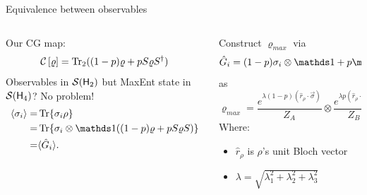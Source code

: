\begin{frame}{Equivalence between observables}
    \begin{columns}
        \begin{column}{0.5\textwidth}
            Our CG map:
            \begin{equation*}
                \mathcal{C}\left[\varrho\right]=\Tr_{2}((1-p)\varrho+pS\varrho S^{\dag})
            \end{equation*}
            Observables in $\mathcal{S}({\sf H}_{2})$ but MaxEnt state in $\mathcal{S}({\sf H}_{4})$? No problem!
            \begin{align*}
                \langle \sigma_{i}\rangle=&\Tr{\sigma_{i} \rho}\\
                =&\Tr{\sigma_{i}\otimes\Id((1-p)\varrho+pS\varrho S)}\\
                =&\langle \hat{G}_{i}\rangle.
            \end{align*}
        \end{column}
        \begin{column}{0.5\textwidth}
            Construct $\varrho_{max}$ via
            \begin{equation*}
                \hat{G}_{i}=(1-p)\sigma_{i}\otimes\Id+p\Id\otimes\sigma_{i}.
            \end{equation*}
            as
            \begin{equation*}
                \varrho_{max}=\frac{e^{\lambda (1-p)(\hat{r}_{\rho}\cdot\vec{\sigma})}}{Z_{A}} \otimes \frac{e^{\lambda p(\hat{r}_{\rho}\cdot\vec{\sigma})}}{Z_{B}}.
            \end{equation*}
            Where:
            \begin{itemize}
                \item $\hat{r}_{\rho}$ is $\rho$'s unit Bloch vector
                \item $\lambda=\sqrt{\lambda^{2}_{1}+\lambda^{2}_{2}+\lambda^{2}_{3}}$
            \end{itemize}
        \end{column}
    \end{columns}
\end{frame}

